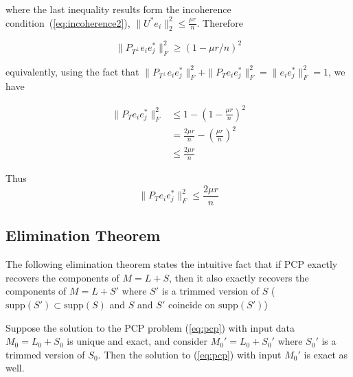where the last inequality results form the incoherence condition~(\ref{eq:incoherence2}), $\|U^*e_i\|_2^2 \leq \frac{\mu r}{n}$. Therefore

\begin{equation}
\|P_{T^\perp} e_ie_j^*\|_F^2 \geq (1 - \mu r / n)^2   \label{property: p3}
\end{equation}

equivalently, using the fact that $\|P_{T^\perp} e_ie_j^*\|_F^2 + \|P_{T} e_ie_j^*\|_F^2 = \|e_ie_j^*\|_F^2 = 1$, we have

\begin{align*}
\|P_{T} e_ie_j^*\|_F^2
&\leq 1 - (1 - \frac{\mu r}{n})^2 \\
&= \frac{2\mu r}{n} - \left( \frac{\mu r}{n} \right)^2 \\
&\leq \frac{2\mu r}{n}
\end{align*}

Thus
\begin{equation}
  \|P_{T} e_ie_j^*\|_F^2 \leq \frac{2\mu r}{n}   \label{property: p4}
\end{equation}
\subsection{Elimination Theorem}
The following elimination theorem states the intuitive fact that if PCP exactly recovers the components of $M = L+S$, then it also exactly recovers the components of $M = L+S'$ where $S'$ is a trimmed version of $S$ ($\text{supp}(S')\subset \text{supp}(S)$ and $S$ and $S'$ coincide on $\text{supp}(S')$)

\begin{theorem}
Suppose the solution to the PCP problem (\ref{eq:pcp}) with input data $M_0 = L_0 + S_0$ is unique and exact, and consider $M_0' = L_0 + S_0'$ where $S_0'$ is a trimmed version of $S_0$. Then the solution to (\ref{eq:pcp}) with input $M_0'$ is exact as well.
\end{theorem}

